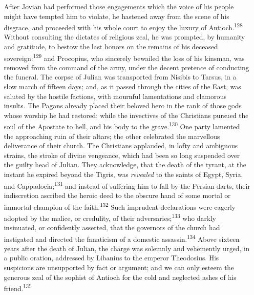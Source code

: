 After Jovian had performed those engagements which the voice of
his people might have tempted him to violate, he hastened away
from the scene of his disgrace, and proceeded with his whole
court to enjoy the luxury of Antioch.\textsuperscript{128} Without consulting the
dictates of religious zeal, he was prompted, by humanity and
gratitude, to bestow the last honors on the remains of his
deceased sovereign:\textsuperscript{129} and Procopius, who sincerely bewailed the
loss of his kinsman, was removed from the command of the army,
under the decent pretence of conducting the funeral. The corpse
of Julian was transported from Nisibis to Tarsus, in a slow march
of fifteen days; and, as it passed through the cities of the
East, was saluted by the hostile factions, with mournful
lamentations and clamorous insults. The Pagans already placed
their beloved hero in the rank of those gods whose worship he had
restored; while the invectives of the Christians pursued the soul
of the Apostate to hell, and his body to the grave.\textsuperscript{130} One party
lamented the approaching ruin of their altars; the other
celebrated the marvellous deliverance of their church. The
Christians applauded, in lofty and ambiguous strains, the stroke
of divine vengeance, which had been so long suspended over the
guilty head of Julian. They acknowledge, that the death of the
tyrant, at the instant he expired beyond the Tigris, was
\textit{revealed} to the saints of Egypt, Syria, and Cappadocia;\textsuperscript{131} and
instead of suffering him to fall by the Persian darts, their
indiscretion ascribed the heroic deed to the obscure hand of some
mortal or immortal champion of the faith.\textsuperscript{132} Such imprudent
declarations were eagerly adopted by the malice, or credulity, of
their adversaries;\textsuperscript{133} who darkly insinuated, or confidently
asserted, that the governors of the church had instigated and
directed the fanaticism of a domestic assassin.\textsuperscript{134} Above sixteen
years after the death of Julian, the charge was solemnly and
vehemently urged, in a public oration, addressed by Libanius to
the emperor Theodosius. His suspicions are unsupported by fact or
argument; and we can only esteem the generous zeal of the sophist
of Antioch for the cold and neglected ashes of his friend.\textsuperscript{135}


